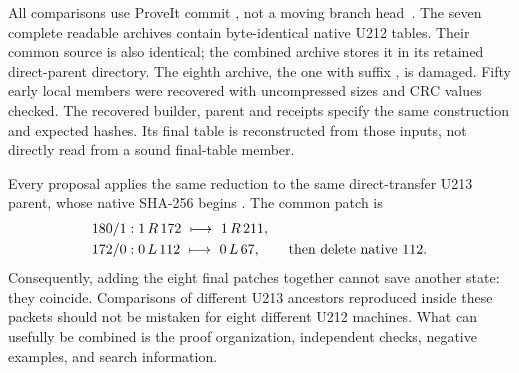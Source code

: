All comparisons use ProveIt commit
, not a moving branch
head~\cite{snapshot}. The seven complete readable archives contain
byte-identical native U212 tables. Their common source is also identical;
the combined archive stores it in its retained direct-parent directory.
The eighth archive, the one with suffix , is damaged. Fifty early
local members were recovered with uncompressed sizes and CRC values checked.
The recovered builder, parent and receipts specify the same construction
and expected hashes. Its final table is reconstructed from those inputs,
not directly read from a sound final-table member.

Every proposal applies the same reduction to the same direct-transfer U213
parent, whose native SHA-256 begins . The common patch is
\begin{align*}
 180/1 &: 1\,R\,172\ \longmapsto\ 1\,R\,211,\\
 172/0 &: 0\,L\,112\ \longmapsto\ 0\,L\,67,
 \qquad\text{then delete native 112.}
\end{align*}
Consequently, adding the eight final patches together cannot save another
state: they coincide. Comparisons of different U213 ancestors reproduced
inside these packets should not be mistaken for eight different U212
machines. What can usefully be combined is the proof organization,
independent checks, negative examples, and search information.

